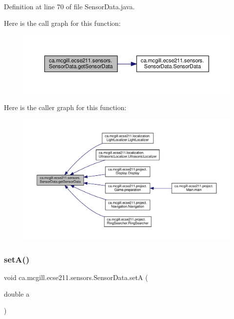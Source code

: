 Definition at line 70 of file Sensor\+Data.\+java.

Here is the call graph for this function\+:\nopagebreak
\begin{figure}[H]
\begin{center}
\leavevmode
\includegraphics[width=350pt]{classca_1_1mcgill_1_1ecse211_1_1sensors_1_1_sensor_data_ab8aef4bdb5d9f3dad399656e00af2539_cgraph}
\end{center}
\end{figure}
Here is the caller graph for this function\+:
\nopagebreak
\begin{figure}[H]
\begin{center}
\leavevmode
\includegraphics[width=350pt]{classca_1_1mcgill_1_1ecse211_1_1sensors_1_1_sensor_data_ab8aef4bdb5d9f3dad399656e00af2539_icgraph}
\end{center}
\end{figure}
\mbox{\label{classca_1_1mcgill_1_1ecse211_1_1sensors_1_1_sensor_data_a9828d8b4dfb9b197e8fd149fb7deb63b}} 
\subsubsection{\texorpdfstring{set\+A()}{setA()}}
{\footnotesize\ttfamily void ca.\+mcgill.\+ecse211.\+sensors.\+Sensor\+Data.\+setA (\begin{DoxyParamCaption}\item[{double}]{a }\end{DoxyParamCaption})}

